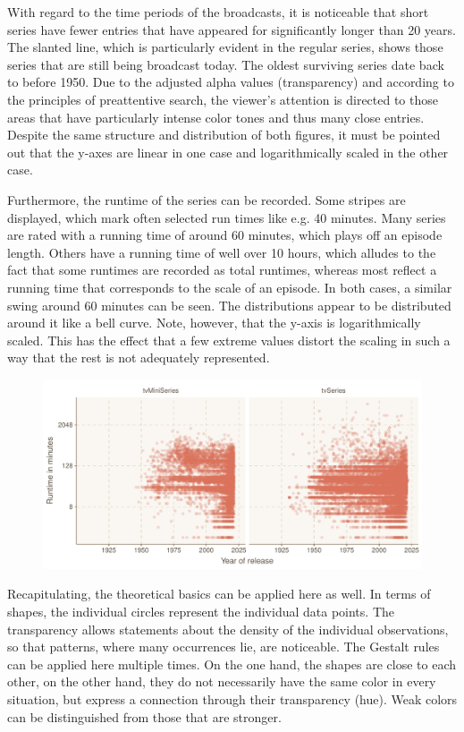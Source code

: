 With regard to the time periods of the broadcasts, it is noticeable that short series have fewer entries that have appeared for significantly longer than 20 years. The slanted line, which is particularly evident in the regular series, shows those series that are still being broadcast today. The oldest surviving series date back to before 1950. Due to the adjusted alpha values (transparency) and according to the principles of preattentive search, the viewer's attention is directed to those areas that have particularly intense color tones and thus many close entries. Despite the same structure and distribution of both figures, it must be pointed out that the y-axes are linear in one case and logarithmically scaled in the other case.

Furthermore, the runtime of the series can be recorded. Some stripes are displayed, which mark often selected run times like e.g. 40 minutes. Many series are rated with a running time of around 60 minutes, which plays off an episode length. Others have a running time of well over 10 hours, which alludes to the fact that some runtimes are recorded as total runtimes, whereas most reflect a running time that corresponds to the scale of an episode. In both cases, a similar swing around 60 minutes can be seen. The distributions appear to be distributed around it like a bell curve. Note, however, that the y-axis is logarithmically scaled. This has the effect that a few extreme values distort the scaling in such a way that the rest is not adequately represented.

\begin{figure}[caption={Runtimes of series}, label={fig:min}]
	{\includegraphics[width=14.5cm]{figures/ts_min.pdf}}
\end{figure}  

Recapitulating, the theoretical basics can be applied here as well. In terms of shapes, the individual circles represent the individual data points. The transparency allows statements about the density of the individual observations, so that patterns, where many occurrences lie, are noticeable. The Gestalt rules can be applied here multiple times. On the one hand, the shapes are close to each other, on the other hand, they do not necessarily have the same color in every situation, but express a connection through their transparency (hue). Weak colors can be distinguished from those that are stronger.

